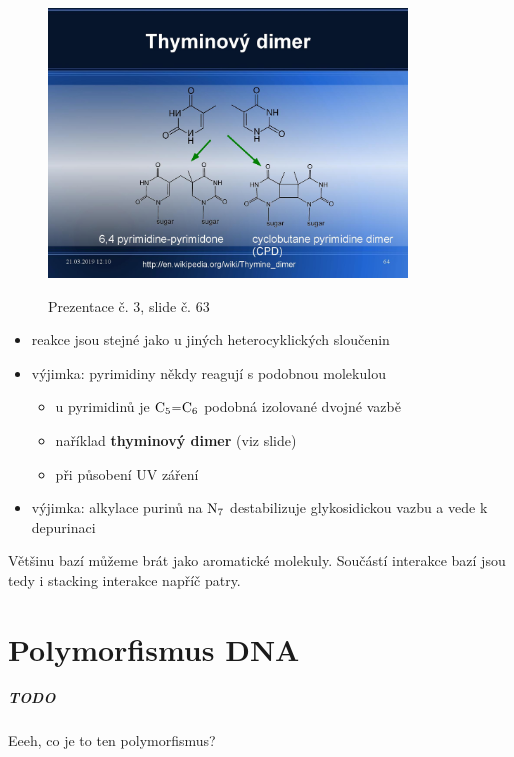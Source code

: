 \documentclass[DIV=8]{scrreprt}
\newcommand{\mybox}[2]{
    \paragraph{#1} #2
}
\begin{document}
\begin{figure}
    \caption{Prezentace č. 3, slide č. 63}
    \includegraphics[width=0.85\textwidth]{slides-3/slide-63.jpg}
    \centering
    \label{slides-3-slide-63}
\end{figure}

\begin{itemize}[nosep]
    \item reakce jsou stejné jako u jiných heterocyklických sloučenin
    \item výjimka: pyrimidiny někdy reagují s podobnou molekulou
\begin{itemize}[nosep]
    \item u pyrimidinů je \(\ce{C5=C6}\) podobná izolované dvojné vazbě
    \item naříklad \textbf{thyminový dimer} (viz slide)
    \item při působení UV záření
\end{itemize}

    \item výjimka: alkylace purinů na \(\ce{N7}\) destabilizuje glykosidickou vazbu a vede k depurinaci
\end{itemize}



Většinu bazí můžeme brát jako aromatické molekuly. Součástí interakce bazí jsou tedy i stacking interakce napříč patry.

\chapter{Polymorfismus DNA} \label{Polymorfismus DNA}


\mybox{TODO}{Eeeh, co je to ten polymorfismus?}
\end{document}

